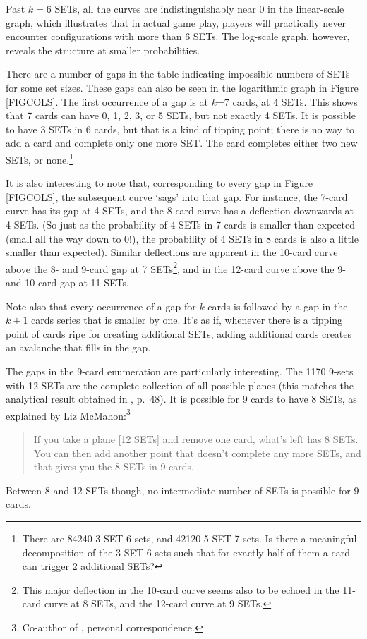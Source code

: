 \documentclass[10pt]{amsart}
\begin{document}
Past $k=6$ SETs, all the curves are indistinguishably near 0 in the linear-scale
graph, which illustrates that in actual game play, players will practically
never encounter configurations with more than 6 SETs. The log-scale graph,
however, reveals the structure at smaller probabilities.

There are a number of gaps in the table indicating impossible numbers of SETs
for some set sizes. These gaps can also be seen in the logarithmic graph in
Figure \ref{FIGCOLS}. The first occurrence of a gap is at $k$=7 cards, at 4
SETs. This shows that 7 cards can have 0, 1, 2, 3, or 5 SETs, but not exactly 4
SETs. It is possible to have 3 SETs in 6 cards, but that is a kind of tipping
point; there is no way to add a  card and complete only one more SET. The
 card completes either two new SETs, or none.\footnote{There are 84240
  3-SET 6-sets, and 42120 5-SET 7-sets. Is there a meaningful decomposition of
  the 3-SET 6-sets such that for exactly half of them a  card can trigger
  2 additional SETs?}

It is also interesting to note that, corresponding to every gap in Figure
\ref{FIGCOLS}, the subsequent curve `sags' into that gap. For instance, the
7-card curve has its gap at 4 SETs, and the 8-card curve has a deflection
downwards at 4 SETs. (So just as the probability of 4 SETs in 7 cards is smaller
than expected (small all the way down to 0!), the probability of 4 SETs in 8
cards is also a little smaller than expected). Similar deflections are apparent
in the 10-card curve above the 8- and 9-card gap at 7 SETs\footnote{This major
  deflection in the 10-card curve seems also to be echoed in the 11-card curve
  at 8 SETs, and the 12-card curve at 9 SETs.}, and in the 12-card curve above
the 9- and 10-card gap at 11 SETs.

Note also that every occurrence of a gap for $k$ cards is followed by a gap in
the $k+1$ cards series that is smaller by one. It's as if, whenever there is a
tipping point of cards ripe for creating additional SETs, adding additional
cards creates an avalanche that fills in the gap.

The gaps in the 9-card enumeration are particularly interesting. The 1170 9-sets
with 12 SETs are the complete collection of all possible planes (this matches
the analytical result obtained in \cite{JOS}, p.~48). It is possible for 9 cards
to have 8 SETs, as explained by Liz McMahon:\footnote{Co-author of \cite{JOS},
  personal correspondence.}
\begin{quote}
If you take a plane [12 SETs] and remove one card, what's left has 8 SETs.  You
can then add another point that doesn't complete any more SETs, and that gives
you the 8 SETs in 9 cards.
\end{quote}
Between 8 and 12 SETs though, no intermediate number of SETs is possible for 9
cards.
\end{document}
